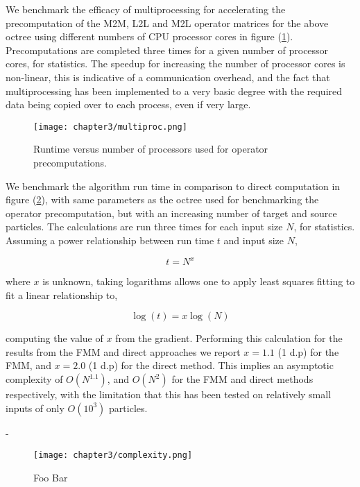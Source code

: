 We benchmark the efficacy of multiprocessing for accelerating the precomputation
of the \gls{M2M}, \gls{L2L} and \gls{M2L} operator matrices for the above octree
using different numbers of CPU processor cores in figure (\ref{fig:3_1_multiproc}).
Precomputations are completed three times for a given number of processor cores,
for statistics. The speedup for increasing the number of processor cores is non-linear, this is
indicative of a communication overhead, and the fact that multiprocessing has
been implemented to a very basic degree with the required data being copied
over to each process, even if very large.

\begin{figure}[ht]
    \centering

  {\texttt{[image: chapter3/multiproc.png]}}
  \vspace{0pt}
    \caption{Runtime versus number of processors used for operator precomputations.}
    \label{fig:3_1_multiproc}
\end{figure}

We benchmark the algorithm run time in comparison to direct computation in figure
(\ref{fig:3_1_complexity}), with same parameters as the octree used for benchmarking
the operator precomputation, but with an increasing number of target and source
particles. The calculations are run three times for each input size $N$, for
statistics. Assuming a power relationship between run time $t$ and input size $N$,

\begin{equation}
    t = N^x
\end{equation}

where $x$ is unknown, taking logarithms allows one to apply least squares fitting
to fit a linear relationship to,

\begin{equation}
    \log(t) = x \log(N)
\end{equation}

computing the value of $x$ from the gradient. Performing this calculation for the
results from the \gls{FMM} and direct approaches we report $x=1.1$ (1 d.p) for
the FMM, and $x=2.0$ (1 d.p) for the direct method. This implies an asymptotic
complexity of $O(N^{1.1})$, and $O(N^2)$ for the \gls{FMM} and direct methods
respectively, with the limitation that this has been tested on relatively
small inputs of only $O(10^3)$ particles.

-\begin{figure}[ht]
    \centering

  {\texttt{[image: chapter3/complexity.png]}}
  \vspace{0pt}
    \caption{Foo Bar}
    \label{fig:3_1_complexity}
\end{figure}

